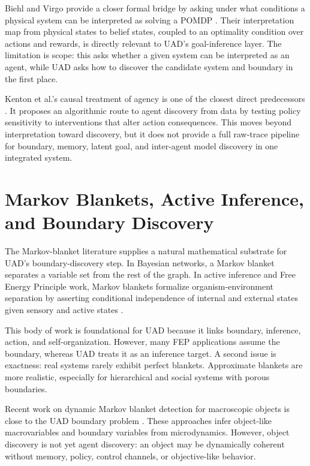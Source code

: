 \documentclass[11pt]{article}
\begin{document}
Biehl and Virgo provide a closer formal bridge by asking under what conditions a physical system can be interpreted as solving a POMDP \cite{biehl2022pomdp}. Their interpretation map from physical states to belief states, coupled to an optimality condition over actions and rewards, is directly relevant to UAD's goal-inference layer. The limitation is scope: this asks whether a given system can be interpreted as an agent, while UAD asks how to discover the candidate system and boundary in the first place.

Kenton et al.'s causal treatment of agency is one of the closest direct predecessors \cite{kenton2022discovering}. It proposes an algorithmic route to agent discovery from data by testing policy sensitivity to interventions that alter action consequences. This moves beyond interpretation toward discovery, but it does not provide a full raw-trace pipeline for boundary, memory, latent goal, and inter-agent model discovery in one integrated system.

\section{Markov Blankets, Active Inference, and Boundary Discovery}

The Markov-blanket literature supplies a natural mathematical substrate for UAD's boundary-discovery step. In Bayesian networks, a Markov blanket separates a variable set from the rest of the graph. In active inference and Free Energy Principle work, Markov blankets formalize organism-environment separation by asserting conditional independence of internal and external states given sensory and active states \cite{friston2010free,kirchhoff2018markov,parr2020markov,dacosta2021bayesianmechanics}.

This body of work is foundational for UAD because it links boundary, inference, action, and self-organization. However, many FEP applications assume the boundary, whereas UAD treats it as an inference target. A second issue is exactness: real systems rarely exhibit perfect blankets. Approximate blankets are more realistic, especially for hierarchical and social systems with porous boundaries.

Recent work on dynamic Markov blanket detection for macroscopic objects is close to the UAD boundary problem \cite{beck2025dynamic}. These approaches infer object-like macrovariables and boundary variables from microdynamics. However, object discovery is not yet agent discovery: an object may be dynamically coherent without memory, policy, control channels, or objective-like behavior.
\end{document}
